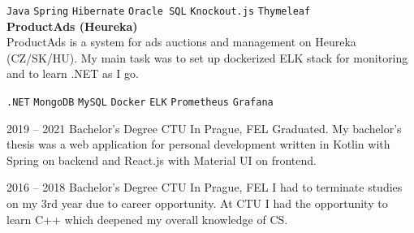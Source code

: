 \documentclass[9pt]{developercv} %
\begin{document}
\begin{entrylist}
{        \texttt{Java}\slashsep
        \texttt{Spring}\slashsep
        \texttt{Hibernate}\slashsep
        \texttt{Oracle SQL}\slashsep
        \texttt{Knockout.js}\slashsep
        \texttt{Thymeleaf}\\

        \textbf{ProductAds (Heureka)}\\
        ProductAds is a system for ads auctions and management on Heureka (CZ/SK/HU).
        My main task was to set up dockerized ELK stack for monitoring and to learn .NET as I go.

        \texttt{.NET}\slashsep
        \texttt{MongoDB}\slashsep
        \texttt{MySQL}\slashsep
        \texttt{Docker}\slashsep
        \texttt{ELK}\slashsep
        \texttt{Prometheus}\slashsep
        \texttt{Grafana}\\
    }
\end{entrylist}

\newpage



\begin{entrylist}
    \entry
    {2019 -- 2021}
    {Bachelor's Degree}
    {CTU In Prague, FEL}
    {
        Graduated.
        My bachelor's thesis was a web application for personal development written in Kotlin with Spring on backend and React.js with Material UI on frontend.
    }

    \entry
    {2016 -- 2018}
    {Bachelor's Degree}
    {CTU In Prague, FEL}
    {
        I had to terminate studies on my 3rd year due to career opportunity.
        At CTU I had the opportunity to learn C++ which deepened my overall knowledge of CS.
    }
\end{entrylist}

\end{document}
